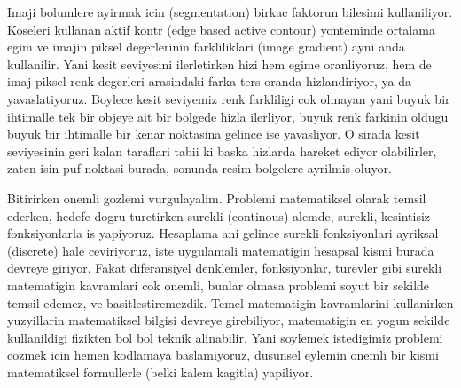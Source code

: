 \documentclass[12pt,fleqn]{article}\usepackage{../common}
\begin{document}
Imaji bolumlere ayirmak icin (segmentation) birkac faktorun bilesimi
kullaniliyor. Koseleri kullanan aktif kontr (edge based active contour)
yonteminde ortalama egim ve imajin piksel degerlerinin farkliliklari (image
gradient) ayni anda kullanilir. Yani kesit seviyesini ilerletirken hizi hem
egime oranliyoruz, hem de imaj piksel renk degerleri arasindaki farka ters
oranda hizlandiriyor, ya da yavaslatiyoruz. Boylece kesit seviyemiz renk
farkliligi cok olmayan yani buyuk bir ihtimalle tek bir objeye ait bir
bolgede hizla ilerliyor, buyuk renk farkinin oldugu buyuk bir ihtimalle bir
kenar noktasina gelince ise yavasliyor. O sirada kesit seviyesinin geri
kalan taraflari tabii ki baska hizlarda hareket ediyor olabilirler, zaten
isin puf noktasi burada, sonunda resim bolgelere ayrilmis oluyor. 

Bitirirken onemli gozlemi vurgulayalim. Problemi matematiksel olarak temsil
ederken, hedefe dogru turetirken surekli (continous) alemde, surekli,
kesintisiz fonksiyonlarla is yapiyoruz. Hesaplama ani gelince surekli
fonksiyonlari ayriksal (discrete) hale ceviriyoruz, iste uygulamali
matematigin hesapsal kismi burada devreye giriyor. Fakat diferansiyel
denklemler, fonksiyonlar, turevler gibi surekli matematigin kavramlari cok
onemli, bunlar olmasa problemi soyut bir sekilde temsil edemez, ve
basitlestiremezdik. Temel matematigin kavramlarini kullanirken yuzyillarin
matematiksel bilgisi devreye girebiliyor, matematigin en yogun sekilde
kullanildigi fizikten bol bol teknik alinabilir. Yani soylemek istedigimiz
problemi cozmek icin hemen kodlamaya baslamiyoruz, dusunsel eylemin onemli
bir kismi matematiksel formullerle (belki kalem kagitla) yapiliyor.
\end{document}
